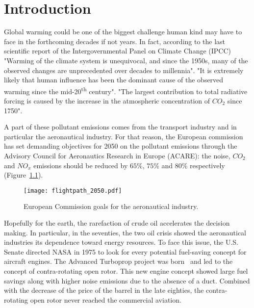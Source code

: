 
\chapter{Introduction}

Global warming could be one of the biggest challenge human kind
may have to face in the forthcoming decades if not years.
In fact, according to the last scientific
report of the Intergovernmental Panel on Climate Change 
(IPCC)~\cite{IPCC2013}
"Warming of the climate system is unequivocal, 
and since the 1950s, many of the observed 
changes are unprecedented over decades to millennia".
"It is extremely likely that human influence has 
been the dominant cause of the 
observed warming since the mid-20\textsuperscript{th} 
century".
"The largest contribution to total radiative 
forcing is caused by the increase in the atmospheric 
concentration of $CO_2$ since 1750".

A part of these pollutant emissions comes from the
transport industry and in particular the
aeronautical industry. 
For that reason, the European commission has set
demanding objectives for 2050 on the pollutant emissions
through the
Advisory Council for 
Aeronautics Research in Europe (ACARE):
the noise, $CO_2$ and $NO_x$ emissions should be reduced by 
$65\%$, $75\%$ and $80\%$ respectively
(Figure~\ref{fig:flightpath_2050}).
\begin{figure}[htp]
  \centering
  \texttt{[image: flightpath\_2050.pdf]}
  \caption{European Commission goals for the aeronautical industry.}
  \label{fig:flightpath_2050}
\end{figure}

Hopefully for the earth,
the rarefaction of crude oil accelerates the decision making.
In particular, in the seventies, the two oil crisis showed the aeronautical 
industries its dependence toward energy resources. 
To face this issue, the U.S. Senate directed NASA in 1975
to look for every potential fuel-saving concept for aircraft
engines. The Advanced Turboprop
project was born~\cite{Hager1988} and led to the
concept of contra-rotating open rotor. This new
engine concept showed large fuel savings
along with higher noise emissions due to the absence of
a duct. Combined with the decrease of the price of the
barrel in the late eighties, the contra-rotating open rotor 
never reached the commercial aviation.

